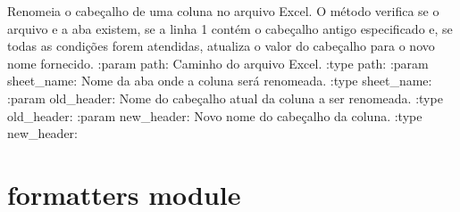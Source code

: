 \documentclass[letterpaper,10pt,english]{sphinxmanual}
\begin{document}
\begin{fulllineitems}
\label{\detokenize{api/excel_io:excel_io.rename_column_header}}
\pysigstartsignatures
\pysiglinewithargsret
{}
{\sphinxparamcomma {}\sphinxparamcomma {}\sphinxparamcomma {}}
{}
\pysigstopsignatures
\sphinxAtStartPar
Renomeia o cabeçalho de uma coluna no arquivo Excel. O método verifica se o arquivo e a aba existem, se a linha 1 contém o cabeçalho antigo especificado e, se todas as condições forem atendidas, atualiza o valor do cabeçalho para o novo nome fornecido.
:param path: Caminho do arquivo Excel.
:type path: 
:param sheet\_name: Nome da aba onde a coluna será renomeada.
:type sheet\_name: 
:param old\_header: Nome do cabeçalho atual da coluna a ser renomeada.
:type old\_header: 
:param new\_header: Novo nome do cabeçalho da coluna.
:type new\_header: 
\begin{quote}\begin{description}
\sphinxAtStartPar
{}

\end{description}\end{quote}

\end{fulllineitems}


\sphinxstepscope


\section{formatters module}
\label{\detokenize{api/formatters:module-formatters}}\label{\detokenize{api/formatters:formatters-module}}\label{\detokenize{api/formatters::doc}}
\end{document}
